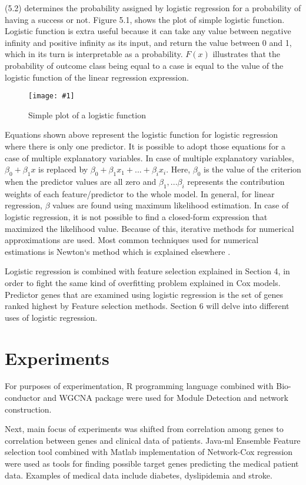 \documentclass{ba-kecs}
\numberwithin{figure}{section}
\numberwithin{equation}{section}
\newcommand{\dkepic}[2]{ %
	\begin{figure}[H] %
	\centerline{\texttt{[image: \#1]}}
	\caption{#2}
	\label{#1}
	\end{figure}
}
\begin{document}
(5.2) determines the probability assigned by logistic regression for a probability of having a success or not. Figure 5.1, shows the plot of simple logistic function. Logistic function is extra useful because it can take any value between negative infinity and positive infinity as its input, and return the value between 0 and 1, which in its turn is interpretable as a probability. $F(x)$ illustrates that the probability of outcome class being equal to a case is equal to the value of the logistic function of the linear regression expression.

\dkepic{logistic}{Simple plot of a logistic function}

Equations shown above represent the logistic function for logistic regression where there is only one predictor. It is possible to adopt those equations for a case of multiple explanatory variables. In case of multiple explanatory variables, $\beta_{0} + \beta_{1}x$ is replaced by $\beta_{0} + \beta_{1}x_{1} + ... + \beta_{i}x_{i}$. Here, $\beta_{0}$ is the value of the criterion when the predictor values are all zero and $\beta_{1}, ... \beta_{i}$ represents the contribution weights of each feature/predictor to the whole model. In general, for linear regression, $\beta$ values are found using maximum likelihood estimation. In case of logistic regression, it is not possible to find a closed-form expression that maximized the likelihood value. Because of this, iterative methods for numerical approximations are used. Most common techniques used for numerical estimations is Newton`s method which is explained elsewhere \cite{newton}.

Logistic regression is combined with feature selection explained in Section 4, in order to fight the same kind of overfitting problem explained in Cox models. Predictor genes that are examined using logistic regression is the set of genes ranked highest by Feature selection methods. Section 6 will delve into different uses of logistic regression.

\section{Experiments}

For purposes of experimentation, R programming language combined with Bio-conductor and WGCNA \cite{wgcna3} package were used for Module Detection and network construction.

Next, main focus of experiments was shifted from correlation among genes to correlation between genes and clinical data of patients. Java-ml \cite{javaml} Ensemble Feature selection tool combined with Matlab implementation of Network-Cox regression were used as tools for finding possible target genes predicting the medical patient data. Examples of medical data include diabetes, dyslipidemia and stroke.
\end{document}
